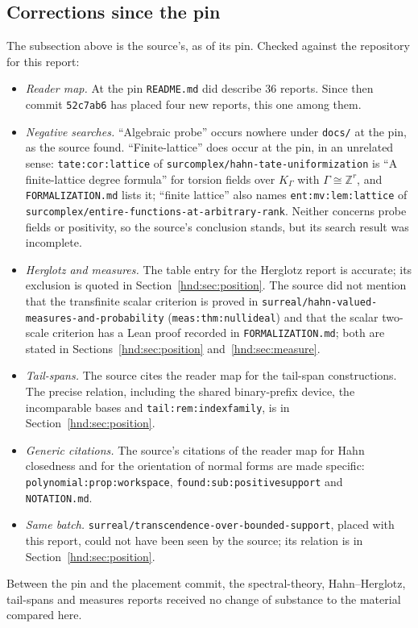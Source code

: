\documentclass[11pt,oneside]{article}
\theoremstyle{definition}
\theoremstyle{remark}
\newcommand{\Z}{\mathbb Z}
\newcommand{\repo}[1]{\nolinkurl{#1}}%
\newcommand{\lbl}[1]{\nolinkurl{#1}}%
\begin{document}
\subsection{Corrections since the pin}\label{hnd:app:pinned}

The subsection above is the source's, as of its pin. Checked against the
repository for this report:
\begin{itemize}
\item \emph{Reader map.} At the pin \repo{README.md} did describe 36
reports. Since then commit \texttt{52c7ab6} has placed four new reports,
this one among them.
\item \emph{Negative searches.} ``Algebraic probe'' occurs nowhere under
\texttt{docs/} at the pin, as the source found. ``Finite-lattice'' does
occur at the pin, in an unrelated sense: \lbl{tate:cor:lattice} of
\repo{surcomplex/hahn-tate-uniformization} is ``A finite-lattice degree
formula'' for torsion fields over $K_\Gamma$ with $\Gamma\cong\Z^r$, and
\repo{FORMALIZATION.md} lists it; ``finite lattice'' also names
\lbl{ent:mv:lem:lattice} of \repo{surcomplex/entire-functions-at-arbitrary-rank}.
Neither concerns probe fields or positivity, so the source's conclusion
stands, but its search result was incomplete.
\item \emph{Herglotz and measures.} The table entry for the Herglotz report
is accurate; its exclusion is quoted in Section~\ref{hnd:sec:position}.
The source did not mention that the transfinite scalar criterion is proved
in \repo{surreal/hahn-valued-measures-and-probability}
(\lbl{meas:thm:nullideal}) and that the scalar two-scale criterion has a
Lean proof recorded in \repo{FORMALIZATION.md}; both are stated in
Sections~\ref{hnd:sec:position} and~\ref{hnd:sec:measure}.
\item \emph{Tail-spans.} The source cites the reader map for the
tail-span constructions. The precise relation, including the shared
binary-prefix device, the incomparable bases and \lbl{tail:rem:indexfamily},
is in Section~\ref{hnd:sec:position}.
\item \emph{Generic citations.} The source's citations of the reader map
for Hahn closedness and for the orientation of normal forms are made
specific: \lbl{polynomial:prop:workspace}, \lbl{found:sub:positivesupport}
and \repo{NOTATION.md}.
\item \emph{Same batch.} \repo{surreal/transcendence-over-bounded-support},
placed with this report, could not have been seen by the source; its
relation is in Section~\ref{hnd:sec:position}.
\end{itemize}
Between the pin and the placement commit, the spectral-theory,
Hahn--Herglotz, tail-spans and measures reports received no change of
substance to the material compared here.
\end{document}
